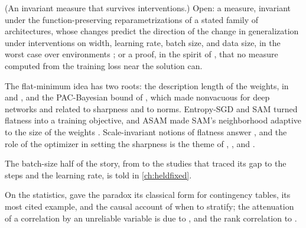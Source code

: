 \begin{refsection}
\begin{exercises}
\item \research (An invariant measure that survives interventions.) Open: a measure, invariant under the function-preserving reparametrizations of a stated family of architectures, whose changes predict the direction of the change in generalization under interventions on width, learning rate, batch size, and data size, in the worst case over environments \parencite{DziugaiteEtAl2020}; or a proof, in the spirit of \textcite{WenLiMa2023}, that no measure computed from the training loss near the solution can.\label{ex:sharpness:research}
\end{exercises}

\notesandrefs
The flat-minimum idea has two roots: the description length of the weights, in \textcite{HintonVanCamp1993} and \textcite{HochreiterSchmidhuber1995,HochreiterSchmidhuber1997}, and the PAC-Bayesian bound of \textcite{McAllester1999}, which \textcite{DziugaiteRoy2017} made nonvacuous for deep networks and \textcite{NeyshaburEtAl2017} related to sharpness and to norms. Entropy-SGD \parencite{ChaudhariEtAl2017} and SAM \parencite{ForetEtAl2021} turned flatness into a training objective, and ASAM made SAM's neighborhood adaptive to the size of the weights \parencite{KwonEtAl2021}. Scale-invariant notions of flatness \parencite{TsuzukuSatoSugiyama2020,PetzkaEtAl2021} answer \textcite{DinhEtAl2017}, and the role of the optimizer in setting the sharpness is the theme of \textcite{WuMaE2018}, \textcite{CohenEtAl2021}, and \textcite{KaurCohenLipton2023}.

The batch-size half of the story, from \textcite{KeskarEtAl2017} to the studies that traced its gap to the steps and the learning rate, is told in \cref{ch:heldfixed}.

On the statistics, \textcite{Simpson1951} gave the paradox its classical form for contingency tables, \textcite{BickelHammelOConnell1975} its most cited example, and \textcite{Pearl2009} the causal account of when to stratify; the attenuation of a correlation by an unreliable variable is due to \textcite{Spearman1904}, and the rank correlation to \textcite{Kendall1938}.


\end{refsection}
